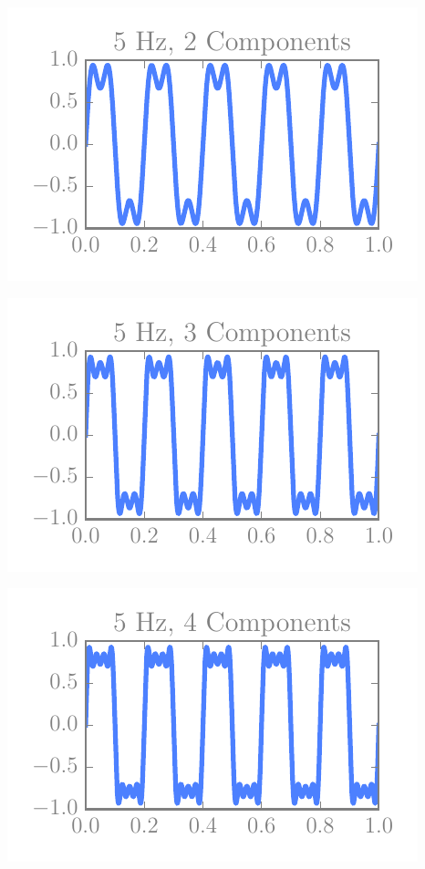 \begin{multicols}{5}
\includegraphics[width=\linewidth]{../img/fouriers/5_2.pdf}

\includegraphics[width=\linewidth]{../img/fouriers/5_3.pdf}

\includegraphics[width=\linewidth]{../img/fouriers/5_4.pdf}


\end{multicols}
